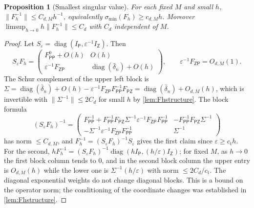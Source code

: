 \documentclass[11pt]{amsart}
\numberwithin{equation}{section}
\newtheorem{proposition}[theorem]{Proposition}
\theoremstyle{definition}
\theoremstyle{remark}
\newcommand{\eps}{\varepsilon}
\newcommand{\norm}[1]{\lVert #1\rVert}
\begin{document}
\begin{proposition}[Smallest singular value]\label{prop:sigmamin}
For each fixed $M$ and small $h$, $\norm{F_h^{-1}}\le C_{d,M}h^{-1}$, equivalently $\sigma_{\min}(F_h)\ge c_{d,M}h$. Moreover $\limsup_{h\to0}h\norm{F_h^{-1}}\le C_d$ with $C_d$ independent of $M$.
\end{proposition}

\begin{proof}
Let $S_\eps=\operatorname{diag}(I_{\mathsf P},\eps^{-1}I_{\mathsf Z})$. Then
\[
S_\eps F_h=\begin{pmatrix}F^0_{\mathsf{PP}}+O(h)&O(h)\\ \eps^{-1}F_{\mathsf{ZP}}&\operatorname{diag}(\bar\delta_n)+O(h)\end{pmatrix},\qquad\eps^{-1}F_{\mathsf{ZP}}=O_{d,M}(1).
\]
The Schur complement of the upper left block is $\Sigma=\operatorname{diag}(\bar\delta_n)+O(h)-\eps^{-1}F_{\mathsf{ZP}}F_{\mathsf{PP}}^{-1}F_{\mathsf{PZ}}=\operatorname{diag}(\bar\delta_n)+O_{d,M}(h)$, which is invertible with $\norm{\Sigma^{-1}}\le2C_d$ for small $h$ by \cref{lem:Fhstructure}. The block formula
\[
(S_\eps F_h)^{-1}=\begin{pmatrix}F_{\mathsf{PP}}^{-1}+F_{\mathsf{PP}}^{-1}F_{\mathsf{PZ}}\Sigma^{-1}\eps^{-1}F_{\mathsf{ZP}}F_{\mathsf{PP}}^{-1}&-F_{\mathsf{PP}}^{-1}F_{\mathsf{PZ}}\Sigma^{-1}\\-\Sigma^{-1}\eps^{-1}F_{\mathsf{ZP}}F_{\mathsf{PP}}^{-1}&\Sigma^{-1}\end{pmatrix}
\]
has norm $\le C_{d,M}$, and $F_h^{-1}=(S_\eps F_h)^{-1}S_\eps$ gives the first claim since $\eps\ge c_{\mathrm t}h$. For the second, $hF_h^{-1}=(S_\eps F_h)^{-1}\operatorname{diag}(hI_{\mathsf P},(h/\eps)I_{\mathsf Z})$; for fixed $M$, as $h\to0$ the first block column tends to $0$, and in the second block column the upper entry is $O_{d,M}(h)$ while the lower one is $\Sigma^{-1}(h/\eps)$ with norm $\le2C_d/c_{\mathrm t}$. The diagonal exponential weights do not change diagonal blocks. This is a bound on the operator norm; the conditioning of the coordinate changes was established in \cref{lem:Fhstructure}.
\end{proof}
\end{document}
